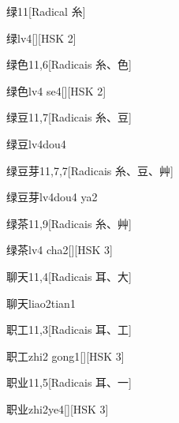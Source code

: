 \begin{entry}{绿}{11}[Radical ⽷]
  \begin{phonetics}{绿}{lv4}[][HSK 2]
  \end{phonetics}
\end{entry}

\begin{entry}{绿色}{11,6}[Radicais ⽷、⾊]
  \begin{phonetics}{绿色}{lv4 se4}[][HSK 2]
  \end{phonetics}
\end{entry}

\begin{entry}{绿豆}{11,7}[Radicais ⽷、⾖]
  \begin{phonetics}{绿豆}{lv4dou4}
  \end{phonetics}
\end{entry}

\begin{entry}{绿豆芽}{11,7,7}[Radicais ⽷、⾖、⾋]
  \begin{phonetics}{绿豆芽}{lv4dou4 ya2}
  \end{phonetics}
\end{entry}

\begin{entry}{绿茶}{11,9}[Radicais ⽷、⾋]
  \begin{phonetics}{绿茶}{lv4 cha2}[][HSK 3]
  \end{phonetics}
\end{entry}

\begin{entry}{聊天}{11,4}[Radicais ⽿、⼤]
  \begin{phonetics}{聊天}{liao2tian1}
  \end{phonetics}
\end{entry}

\begin{entry}{职工}{11,3}[Radicais ⽿、⼯]
  \begin{phonetics}{职工}{zhi2 gong1}[][HSK 3]
  \end{phonetics}
\end{entry}

\begin{entry}{职业}{11,5}[Radicais ⽿、⼀]
  \begin{phonetics}{职业}{zhi2ye4}[][HSK 3]
  \end{phonetics}
\end{entry}

